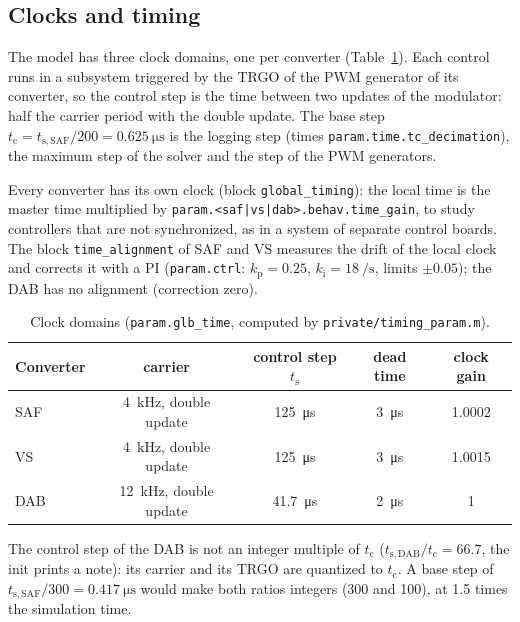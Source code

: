 \documentclass[11pt,a4paper]{scrartcl}
\newcommand{\ped}[1]{_{\mathrm{#1}}}
\newcommand{\code}[1]{\texttt{#1}}
\begin{document}
\begin{onehalfspace}
\subsection{Clocks and timing}
\label{sec:timing}

The model has three clock domains, one per converter (Table~\ref{tab:timing}). Each control runs in a subsystem triggered by the TRGO of the PWM generator of its converter, so the control step is the time between two updates of the modulator: half the carrier period with the double update. The base step $t\ped{c} = t\ped{s,SAF}/200 = \SI{0.625}{\micro\second}$ is the logging step (times \code{param.time.tc\_decimation}), the maximum step of the solver and the step of the PWM generators.

Every converter has its own clock (block \code{global\_timing}): the local time is the master time multiplied by \code{param.<saf|vs|dab>.behav.time\_gain}, to study controllers that are not synchronized, as in a system of separate control boards. The block \code{time\_alignment} of SAF and VS measures the drift of the local clock and corrects it with a PI (\code{param.ctrl}: $k\ped{p} = 0.25$, $k\ped{i} = \SI{18}{\per\second}$, limits $\pm 0.05$); the DAB has no alignment (correction zero).

\begin{table}[H]
	\centering
	\captionsetup{width=0.9\textwidth, font=small}
	\caption{Clock domains (\code{param.glb\_time}, computed by \code{private/timing\_param.m}).}
	\label{tab:timing}
	\footnotesize
	\begin{tabular}{@{} l c c c c @{}}
		\toprule
		\textbf{Converter} & \textbf{carrier} & \textbf{control step $t\ped{s}$} & \textbf{dead time} & \textbf{clock gain} \\
		\midrule
		SAF & \SI{4}{kHz}, double update & \SI{125}{\micro\second} & \SI{3}{\micro\second} & 1.0002 \\
		VS & \SI{4}{kHz}, double update & \SI{125}{\micro\second} & \SI{3}{\micro\second} & 1.0015 \\
		DAB & \SI{12}{kHz}, double update & \SI{41.7}{\micro\second} & \SI{2}{\micro\second} & 1 \\
		\bottomrule
	\end{tabular}
\end{table}

The control step of the DAB is not an integer multiple of $t\ped{c}$ ($t\ped{s,DAB}/t\ped{c} = 66.7$, the init prints a note): its carrier and its TRGO are quantized to $t\ped{c}$. A base step of $t\ped{s,SAF}/300 = \SI{0.417}{\micro\second}$ would make both ratios integers (300 and 100), at 1.5 times the simulation time.


\end{onehalfspace}
\end{document}
